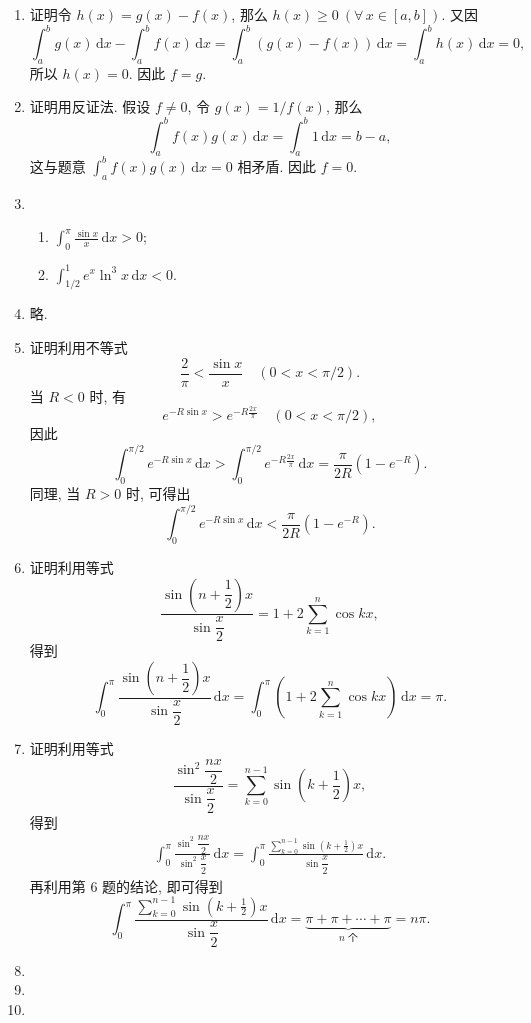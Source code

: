 \documentclass[a4paper, 11pt]{ctexart}
\newcommand{\dif}{\mathrm{d}}
\begin{document}
\begin{enumerate}
    \item %
        {\heiti 证明}\quad 令 $h(x) = g(x) - f(x)$, 那么 $h(x) \geqslant 0\ (\forall\,x \in [a, b])$. 又因
        \[
            \int_a^b g(x)\,\dif x - \int_a^b f(x)\,\dif x = \int_a^b (g(x) - f(x))\,\dif x = \int_a^b h(x)\,\dif x = 0,    
        \]
        所以 $h(x) = 0$. 因此 $f = g$.
    \item %
        {\heiti 证明}\quad 用反证法. 假设 $f \neq 0$, 令 $g(x) = 1/f(x)$, 那么
        \[
            \int_a^b f(x)g(x)\,\dif x = \int_a^b 1 \,\dif x = b - a,    
        \]
        这与题意 $\displaystyle{\int_a^b f(x)g(x)\,\dif x = 0}$ 相矛盾. 因此 $f = 0$.
    \item %
        \begin{enumerate}[(1)]
            \item %
                $\displaystyle{\int_0^\pi\frac{\sin x}{x}\,\dif x > 0}$;
            \item %
                $\displaystyle{\int_{1/2}^1 e^x\ln^3x\,\dif x < 0}$.
        \end{enumerate}
    \item %
        略.
    \item %
        {\heiti 证明}\quad 利用不等式
        \[
            \frac{2}{\pi} < \frac{\sin x}{x}\quad (0 < x < \pi/2).    
        \]
        当 $R < 0$ 时, 有
        \[
            e^{-R\sin x} > e^{-R\frac{2x}{\pi}}\quad (0 < x < \pi/2),    
        \]
        因此
        \[
            \int_0^{\pi/2} e^{-R\sin x}\,\dif x > \int_0^{\pi/2} e^{-R\frac{2x}{\pi}}\,\dif x = \frac{\pi}{2R}(1 - e^{-R}).    
        \]
        同理, 当 $R > 0$ 时, 可得出
        \[
            \int_0^{\pi/2} e^{-R\sin x}\,\dif x < \frac{\pi}{2R}(1 - e^{-R}).    
        \]
    \item %
        {\heiti 证明}\quad 利用等式
        \[
            \frac{\sin\left(n+\dfrac12\right)x}{\sin\dfrac{x}{2}} = 1 + 2\sum_{k=1}^n\cos kx,
        \]
        得到
        \[
            \int_0^\pi\frac{\sin\left(n+\dfrac12\right)x}{\sin\dfrac{x}{2}}\,\dif x = \int_0^\pi \left(1 + 2\sum_{k=1}^n\cos kx\right)\,\dif x = \pi.    
        \]
    \item %
        {\heiti 证明}\quad 利用等式
        \[
            \frac{\sin^2\dfrac{nx}{2}}{\sin\dfrac{x}{2}} = \sum_{k=0}^{n-1}\sin\left(k + \frac12\right)x,    
        \]
        得到
        \begin{align*}
            \int_0^\pi \frac{\sin^2\dfrac{nx}{2}}{\sin^2\dfrac{x}{2}}\,\dif x = \int_0^\pi \frac{\displaystyle{\sum_{k=0}^{n-1}\sin\left(k + \frac12\right)x}}{\sin\dfrac{x}{2}}\,\dif x.  
        \end{align*}
        再利用第 6 题的结论, 即可得到
        \[
            \int_0^\pi \frac{\displaystyle{\sum_{k=0}^{n-1}\sin\left(k + \frac12\right)x}}{\sin\dfrac{x}{2}}\,\dif x = \underbrace{\pi + \pi + \cdots + \pi}_{\text{$n$ 个}} = n\pi.     
        \]
    \item %
    \item %
    \item %
\end{enumerate}
\end{document}
